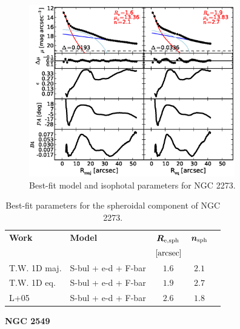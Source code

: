 \documentclass[preprint2]{emulateapj}
\newcommand{\fitfigurewidth}{0.8\textwidth}
\begin{document}
  \begin{figure}[h]
  \begin{center}
  \includegraphics[width=\fitfigurewidth]{images/n2273_1Dfit.eps}
  \caption{Best-fit model and isophotal parameters for NGC 2273.}
  \end{center}
  \end{figure}

  \begin{table}[h]
  \small
  \caption{Best-fit parameters for the spheroidal component of NGC 2273.}
  \begin{center}
  \begin{tabular}{llccc}
  \hline
  {\bf Work} & {\bf Model}   & $\bm R_{\rm e,sph}$    & $\bm n_{\rm sph}$ \\
    &  &  $[\rm arcsec]$ & \\
  \hline
  T.W. 1D maj. & S-bul + e-d + F-bar & $1.6$  &  $2.1$ \\
  T.W. 1D eq.  & S-bul + e-d + F-bar & $1.9$  &  $2.7$ \\
  \hline
  L+05         & S-bul + e-d + F-bar & $2.6$  &  $1.8$ \\
  \hline
  \end{tabular}
  \end{center}
  \label{tab:n2273}
  \end{table}

  \clearpage\newpage\noindent
  {\bf NGC 2549 \\}
\end{document}
